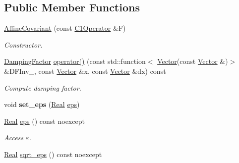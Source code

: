 \subsection*{Public Member Functions}
\begin{DoxyCompactItemize}
\item 
\hypertarget{classSpacy_1_1Newton_1_1Damping_1_1AffineCovariant_abf3615a91c70a145759d74eff761ec51}{\hyperlink{classSpacy_1_1Newton_1_1Damping_1_1AffineCovariant_abf3615a91c70a145759d74eff761ec51}{Affine\-Covariant} (const \hyperlink{classSpacy_1_1C1Operator}{C1\-Operator} \&F)}\label{classSpacy_1_1Newton_1_1Damping_1_1AffineCovariant_abf3615a91c70a145759d74eff761ec51}

\begin{DoxyCompactList}\small\item\em Constructor. \end{DoxyCompactList}\item 
\hypertarget{classSpacy_1_1Newton_1_1Damping_1_1AffineCovariant_a451040d8a986f1ae912b34713ced26ec}{\hyperlink{classSpacy_1_1DampingFactor}{Damping\-Factor} \hyperlink{classSpacy_1_1Newton_1_1Damping_1_1AffineCovariant_a451040d8a986f1ae912b34713ced26ec}{operator()} (const std\-::function$<$ \hyperlink{classSpacy_1_1Vector}{Vector}(const \hyperlink{classSpacy_1_1Vector}{Vector} \&)$>$ \&D\-F\-Inv\-\_\-, const \hyperlink{classSpacy_1_1Vector}{Vector} \&x, const \hyperlink{classSpacy_1_1Vector}{Vector} \&dx) const }\label{classSpacy_1_1Newton_1_1Damping_1_1AffineCovariant_a451040d8a986f1ae912b34713ced26ec}

\begin{DoxyCompactList}\small\item\em Compute damping factor. \end{DoxyCompactList}\item 
\hypertarget{classSpacy_1_1Mixin_1_1Eps_a818ab6dfab5e4eea583e1302bcc621f8}{void {\bfseries set\-\_\-eps} (\hyperlink{classSpacy_1_1Real}{Real} \hyperlink{classSpacy_1_1Mixin_1_1Eps_a812b99b0abc1d78a34b4114907f23f52}{eps})}\label{classSpacy_1_1Mixin_1_1Eps_a818ab6dfab5e4eea583e1302bcc621f8}

\item 
\hypertarget{classSpacy_1_1Mixin_1_1Eps_a812b99b0abc1d78a34b4114907f23f52}{\hyperlink{classSpacy_1_1Real}{Real} \hyperlink{classSpacy_1_1Mixin_1_1Eps_a812b99b0abc1d78a34b4114907f23f52}{eps} () const noexcept}\label{classSpacy_1_1Mixin_1_1Eps_a812b99b0abc1d78a34b4114907f23f52}

\begin{DoxyCompactList}\small\item\em Access $\varepsilon$. \end{DoxyCompactList}\item 
\hypertarget{classSpacy_1_1Mixin_1_1Eps_a1c1b0ed7f14ed4967dc7da9295a136d4}{\hyperlink{classSpacy_1_1Real}{Real} \hyperlink{classSpacy_1_1Mixin_1_1Eps_a1c1b0ed7f14ed4967dc7da9295a136d4}{sqrt\-\_\-eps} () const noexcept}\label{classSpacy_1_1Mixin_1_1Eps_a1c1b0ed7f14ed4967dc7da9295a136d4}


\end{DoxyCompactItemize}
